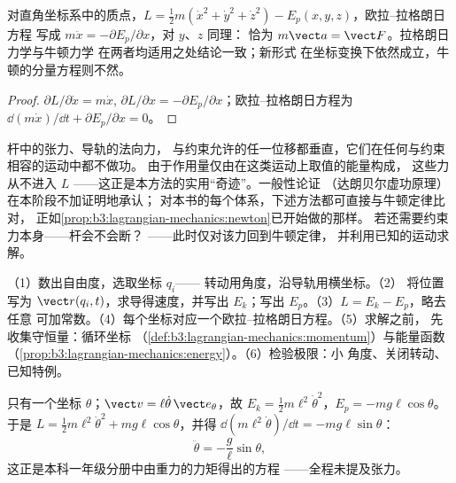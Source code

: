 \begin{proposition}[牛顿定律的再现]\label{prop:b3:lagrangian-mechanics:newton}
对直角坐标系中的质点，$L = \tfrac12 m(\dot x^2 +
\dot y^2 + \dot z^2) - E_p(x,y,z)$，欧拉–拉格朗日方程
写成 $m\ddot x = -\partial E_p/\partial x$，对 $y$、$z$ 同理：
恰为 $m\vect a = \vect F$。拉格朗日力学与牛顿力学
在两者均适用之处结论一致；新形式
在坐标变换下依然成立，牛顿的分量方程则不然。
\end{proposition}

\begin{proof}
$\partial L/\partial\dot x = m\dot x$, $\partial L/\partial x =
-\partial E_p/\partial x$；欧拉–拉格朗日方程为
$\dd(m\dot x)/\dd t + \partial E_p/\partial x = 0$。
\end{proof}

\begin{remark}[约束力为何消失]\label{rem:b3:lagrangian-mechanics:constraints}
杆中的张力、导轨的法向力，
与约束允许的任一位移都垂直，它们在任何与约束相容的运动中都不做功。
由于作用量仅由在这类运动上取值的能量构成，
这些力从不进入 $L$
——这正是本方法的实用“奇迹”。一般性论证
（达朗贝尔虚功原理）在本阶段不加证明地承认；
对本书的每个体系，下述方法都可直接与牛顿定律比对，
正如\cref{prop:b3:lagrangian-mechanics:newton}已开始做的那样。
若还需要约束力本身——杆会不会断？
——此时仅对该力回到牛顿定律，
并利用已知的运动求解。
\end{remark}

\begin{method}[拉格朗日方法步骤]\label{met:b3:lagrangian-mechanics:recipe}
（1）数出自由度，选取坐标 $q_i$——
转动用角度，沿导轨用横坐标。（2）
将位置写为 $\vect r(q_i, t)$，求导得速度，并写出
$E_k$；写出 $E_p$。（3）$L = E_k - E_p$，略去任意
可加常数。（4）每个坐标对应一个欧拉–拉格朗日方程。（5）求解之前，
先收集守恒量：循环坐标
（\cref{def:b3:lagrangian-mechanics:momentum}）与能量函数
（\cref{prop:b3:lagrangian-mechanics:energy}）。（6）检验极限：小
角度、关闭转动、已知特例。
\end{method}

\begin{example}[单摆：三行推导]\label{ex:b3:lagrangian-mechanics:pendulum}
只有一个坐标 $\theta$；$\vect v = \ell\dot\theta\,\vect e_\theta$，故
$E_k = \tfrac12 m\ell^2\dot\theta^2$，$E_p = -mg\ell\cos\theta$。
于是 $L = \tfrac12 m\ell^2\dot\theta^2 + mg\ell\cos\theta$，并得
$\dd(m\ell^2\dot\theta)/\dd t = -mg\ell\sin\theta$：
\[
\ddot\theta = -\frac{g}{\ell}\sin\theta ,
\]
这正是本科一年级分册中由重力的力矩得出的方程
——全程未提及张力。
\end{example}

